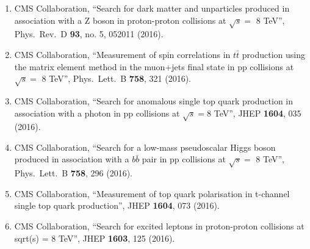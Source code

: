 \begin{enumerate}
\item CMS Collaboration, ``Search for dark matter and unparticles produced in association with a Z boson in proton-proton collisions at $\sqrt s=$ 8 TeV'', Phys.\ Rev.\ D {\bf 93}, no. 5, 052011 (2016).

\item CMS Collaboration, ``Measurement of spin correlations in $t\bar{t}$ production using the matrix element method in the muon+jets final state in pp collisions at $\sqrt{s} =$ 8 TeV'', Phys.\ Lett.\ B {\bf 758}, 321 (2016).

\item CMS Collaboration, ``Search for anomalous single top quark production in association with a photon in pp collisions at $ \sqrt{s}=8 $ TeV'', JHEP {\bf 1604}, 035 (2016).

\item CMS Collaboration, ``Search for a low-mass pseudoscalar Higgs boson produced in association with a $b\bar{b}$ pair in pp collisions at $\sqrt{s} =$ 8 TeV'', Phys.\ Lett.\ B {\bf 758}, 296 (2016).

\item CMS Collaboration, ``Measurement of top quark polarisation in t-channel single top quark production'', JHEP {\bf 1604}, 073 (2016).

\item CMS Collaboration, ``Search for excited leptons in proton-proton collisions at sqrt(s) = 8 TeV'', JHEP {\bf 1603}, 125 (2016).


\end{enumerate}
